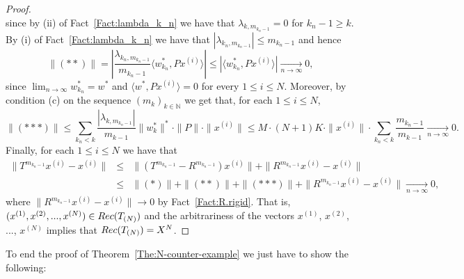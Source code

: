 \documentclass[openright,11pt]{article}
\theoremstyle{plain}
\theoremstyle{definition}
\newcommand{\NN}{\mathbb{N}}
\newcommand{\Rec}{\textup{Rec}}
\newcommand{\ep}[2]{\langle #1 , #2 \rangle}
\begin{document}
\begin{proof}
\[	\]
	since by (ii) of Fact~\ref{Fact:lambda_k_n} we have that $\lambda_{k,m_{k_n-1}} = 0$ for $k_n-1 \geq k$. By (i) of Fact~\ref{Fact:lambda_k_n} we have that $|\lambda_{k_n,m_{k_n-1}}| \leq m_{k_n-1}$ and hence
	\[
	\|(**)\| = \left| \frac{\lambda_{k_n,m_{k_n-1}}}{m_{k_n-1}} \ep{w_{k_n}^*}{Px^{(i)}} \right| \leq |\ep{w_{k_n}^*}{Px^{(i)}}| \underset{n\to\infty}{\longrightarrow} 0,
	\]
	since $\lim_{n\to\infty} w_{k_n}^* = w^*$ and $\ep{w^*}{Px^{(i)}}=0$ for every $1\leq i\leq N$. Moreover, by condition (c) on the sequence $(m_k)_{k\in\NN}$ we get that, for each $1\leq i\leq N$,
	\[
	\|(***)\| \leq \sum_{k_n < k} \frac{\left|\lambda_{k,m_{k_n-1}}\right|}{m_{k-1}} \|w_k^*\|^* \cdot \|P\| \cdot \|x^{(i)}\| \leq M \cdot (N+1)K \cdot \|x^{(i)}\| \cdot \sum_{k_n < k} \frac{m_{k_n-1}}{m_{k-1}} \underset{n\to \infty}{\longrightarrow} 0.
	\]
	Finally, for each $1\leq i \leq N$ we have that
	\begin{eqnarray*}
		\|T^{m_{k_n-1}}x^{(i)} - x^{(i)}\| &\leq& \|\left(T^{m_{k_n-1}}-R^{m_{k_n-1}}\right)x^{(i)}\| + \|R^{m_{k_n-1}}x^{(i)} - x^{(i)}\| \nonumber\\[8pt]
		&\leq& \|(*)\| + \|(**)\| + \|(***)\| + \|R^{m_{k_n-1}}x^{(i)} - x^{(i)}\| \underset{n\to\infty}{\longrightarrow} 0, \nonumber
	\end{eqnarray*}
	where $\|R^{m_{k_n-1}}x^{(i)}-x^{(i)}\| \to 0$ by Fact~\ref{Fact:R.rigid}. That is, $(x^{(1)},x^{(2)},...,x^{(N)}) \in \Rec(T_{(N)})$ and the arbitrariness of the vectors $x^{(1)}$, $x^{(2)}$, ..., $x^{(N)}$ implies that $\Rec(T_{(N)})=X^N$.
\end{proof}

To end the proof of Theorem~\ref{The:N-counter-example} we just have to show the following:
\end{document}
